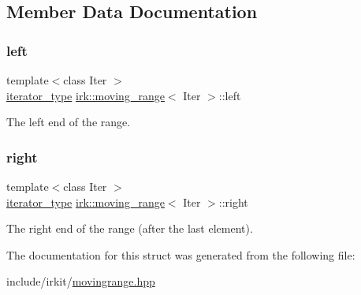 \subsection{Member Data Documentation}
\mbox{\label{structirk_1_1moving__range_a320ea432eef08a78898777273010d605}} 
\subsubsection{\texorpdfstring{left}{left}}
{\footnotesize\ttfamily template$<$class Iter $>$ \\
\mbox{\hyperlink{structirk_1_1moving__range_ad77e99c581516edfaae4cdb3cc6793ba}{iterator\+\_\+type}} \mbox{\hyperlink{structirk_1_1moving__range}{irk\+::moving\+\_\+range}}$<$ Iter $>$\+::left}



The left end of the range. 

\mbox{\label{structirk_1_1moving__range_a60373930b24fd6f602d42cc06f129229}} 
\subsubsection{\texorpdfstring{right}{right}}
{\footnotesize\ttfamily template$<$class Iter $>$ \\
\mbox{\hyperlink{structirk_1_1moving__range_ad77e99c581516edfaae4cdb3cc6793ba}{iterator\+\_\+type}} \mbox{\hyperlink{structirk_1_1moving__range}{irk\+::moving\+\_\+range}}$<$ Iter $>$\+::right}



The right end of the range (after the last element). 



The documentation for this struct was generated from the following file\+:\begin{DoxyCompactItemize}
\item 
include/irkit/\mbox{\hyperlink{movingrange_8hpp}{movingrange.\+hpp}}\end{DoxyCompactItemize}
